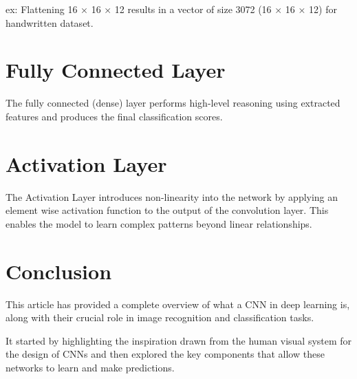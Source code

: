 \documentclass[a4paper]{article}
\begin{document}
ex: Flattening 16 × 16 × 12 results in a vector of size 3072 (16 × 16 × 12) for handwritten dataset.

\section{Fully Connected Layer}
The fully connected (dense) layer performs high-level reasoning using extracted features and produces the final classification scores.

\section{Activation Layer}
The Activation Layer introduces non-linearity into the network by applying an element wise activation function to the output of the convolution layer. This enables the model to learn complex patterns beyond linear relationships.


\section{Conclusion}
This article has provided a complete overview of what a CNN in deep learning is, along with their crucial role in image recognition and classification tasks.

It started by highlighting the inspiration drawn from the human visual system for the design of CNNs and then explored the key components that allow these networks to learn and make predictions.
\end{document}

